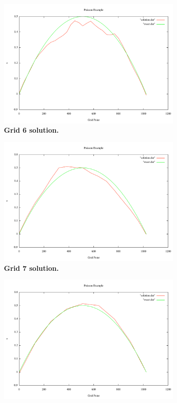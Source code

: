 \documentclass[note]{TechNote}
\begin{document}
\begin{figure}[h!]
\begin{subfigure}[b]{0.32\textwidth}
    \includegraphics[width=\textwidth]{cg_6_level.pdf}
    \caption{\textbf{Grid 6 solution.}}
  \end{subfigure}
  \begin{subfigure}[b]{0.32\textwidth}
    \includegraphics[width=\textwidth]{cg_7_level.pdf}
    \caption{\textbf{Grid 7 solution.}}
  \end{subfigure}
  \begin{subfigure}[b]{0.32\textwidth}
    \includegraphics[width=\textwidth]{cg_8_level.pdf}

\end{subfigure}
\end{figure}
\end{document}
